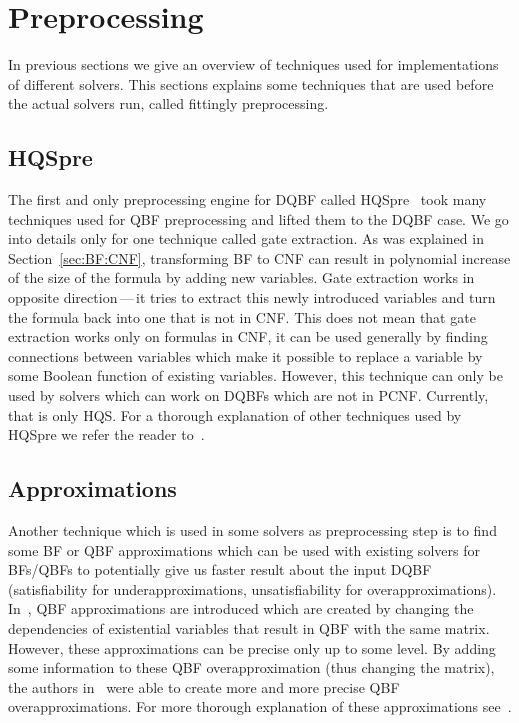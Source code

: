 \documentclass[
  digital, %
  twoside, %
  table,   %
  nolof,     %
  nolot,     %
]{fithesis3}
\theoremstyle{definition}
\theoremstyle{remark}
\begin{document}
\section{Preprocessing}
\label{sec:preprocessing}
In previous sections we give an overview of techniques used for implementations of different solvers. This sections explains some techniques that are used before the actual solvers run, called fittingly preprocessing.



\subsection{HQSpre}
The first and only preprocessing engine for DQBF called HQSpre~\cite{HQSpre1,HQSpre2,HQSpreJournal} took many techniques used for QBF preprocessing and lifted them to the DQBF case. We go into details only for one technique called gate extraction. As was explained in Section~\ref{sec:BF:CNF}, transforming BF to CNF can result in polynomial increase of the size of the formula by adding new variables. Gate extraction works in opposite direction\,---\,it tries to extract this newly introduced variables and turn the formula back into one that is not in CNF. This does not mean that gate extraction works only on formulas in CNF, it can be used generally by finding connections between variables which make it possible to replace a variable by some Boolean function of existing variables. However, this technique can only be used by solvers which can work on DQBFs which are not in PCNF. Currently, that is only HQS. For a thorough explanation of other techniques used by HQSpre we refer the reader to~\cite{HQSpreJournal}. 

\subsection{Approximations}
Another technique which is used in some solvers as preprocessing step is to find some BF or QBF approximations which can be used with existing solvers for BFs/QBFs to potentially give us faster result about the input DQBF (satisfiability for underapproximations, unsatisfiability for overapproximations). In~\cite{HQSsimpleAlg}, QBF approximations are introduced which are created by changing the dependencies of existential variables that result in QBF with the same matrix. However, these approximations can be precise only up to some level. By adding some information to these QBF overapproximation (thus changing the matrix), the authors in~\cite{FastDQBFRefutation} were able to create more and more precise QBF overapproximations. For more thorough explanation of these approximations see~\cite[Section~3]{HQSpreJournal}.
\end{document}

